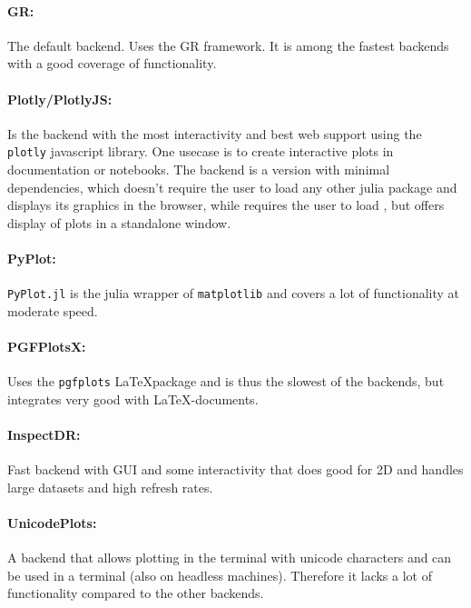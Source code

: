 \paragraph{GR:} The default backend.
Uses the GR framework\cite{heinenGRFrameworkGR}.
It is among the fastest backends with a good coverage of functionality.

\paragraph{Plotly/PlotlyJS:} Is the backend with the most interactivity and best web support using the \texttt{plotly} javascript library\cite{PlotlyJavaScriptGraphing}.
One usecase is to create interactive plots in documentation\cite{PlottingSpectralDistances} or notebooks.
The  backend is a version with minimal dependencies, which doesn't require the user to load any other julia package and displays its graphics in the browser, while  requires the user to load , but offers display of plots in a standalone window.

\paragraph{PyPlot:} \texttt{PyPlot.jl} is the julia wrapper of \texttt{matplotlib}\cite{Hunter:2007} and covers a lot of functionality at moderate speed.

\paragraph{PGFPlotsX:} Uses the \texttt{pgfplots} \LaTeX package\cite{PGFPlotsLaTeXPackage} and is thus the slowest of the backends, but integrates very good with \LaTeX-documents.

\paragraph{InspectDR:} Fast backend with GUI and some interactivity that does good for 2D and handles large datasets and high refresh rates\cite{ma-laforgeInspectDRJlFast2022}.

\paragraph{UnicodePlots:} A backend that allows plotting in the terminal with unicode characters and can be used in a terminal (also on headless machines)\cite{UnicodePlots2022}.
Therefore it lacks a lot of functionality compared to the other backends.


